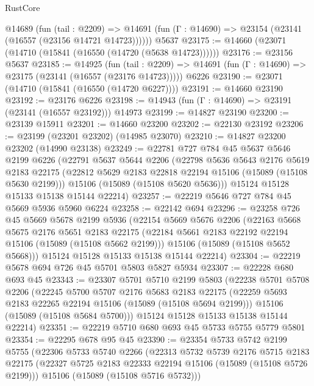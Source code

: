 \begin{lexlean}{RustCore}
\begin{coremodule}
    @14689
      (fun (tail : @2209) =>
      @14691 (fun (Γ : @14690) => @23154 (@23141 (@16557 (@23156 @14721 @14723))))))
    @5637
@23175 := @14660 (@23071 (@14710 (@15841 (@16550 (@14720 (@5638 @14723))))))
@23176 := @23156 @5637
@23185 := @14925
    (fun (tail : @2209) => @14691 (fun (Γ : @14690) => @23175 (@23141 (@16557 (@23176 @14723)))))
    @6226
@23190 := @23071 (@14710 (@15841 (@16550 (@14720 @6227))))
@23191 := @14660 @23190
@23192 := @23176 @6226
@23198 := @14943 (fun (Γ : @14690) => @23191 (@23141 (@16557 @23192))) @14973
@23199 := @14827 @23190
@23200 := @23139 @15911
@23201 := @14660 @23200
@23202 := @22130 @23192
@23206 := @23199 (@23201 @23202) (@14985 @23070)
@23210 := @14827 @23200 @23202 (@14990 @23138)
@23249 := @22781
    @727
    @784
    @45
    @5637
    @5646
    @2199
    @6226
    (@22791
      @5637
      @5644
      @2206
      (@22798
        @5636
        @5643
        @2176
        @5619
        @2183
        @22175
        (@22812 @5629 @2183 @22818 @22194 @15106 (@15089 (@15108 @5630 @2199)))
        @15106
        (@15089 (@15108 @5620 @5636)))
      @15124
      @15128
      @15133
      @15138
      @15144
      @22214)
@23257 := @22219 @5646 @727 @784 @45 @5669 @5936 @5960 @6224
@23258 := @22142 @694
@23296 := @23258
    @726
    @45
    @5669
    @5678
    @2199
    @5936
    (@22154
      @5669
      @5676
      @2206
      (@22163
        @5668
        @5675
        @2176
        @5651
        @2183
        @22175
        (@22184 @5661 @2183 @22192 @22194 @15106 (@15089 (@15108 @5662 @2199)))
        @15106
        (@15089 (@15108 @5652 @5668)))
      @15124
      @15128
      @15133
      @15138
      @15144
      @22214)
@23304 := @22219 @5678 @694 @726 @45 @5701 @5803 @5827 @5934
@23307 := @22228 @680 @693 @45
@23343 := @23307
    @5701
    @5710
    @2199
    @5803
    (@22238
      @5701
      @5708
      @2206
      (@22245
        @5700
        @5707
        @2176
        @5683
        @2183
        @22175
        (@22259 @5693 @2183 @22265 @22194 @15106 (@15089 (@15108 @5694 @2199)))
        @15106
        (@15089 (@15108 @5684 @5700)))
      @15124
      @15128
      @15133
      @15138
      @15144
      @22214)
@23351 := @22219 @5710 @680 @693 @45 @5733 @5755 @5779 @5801
@23354 := @22295 @678 @95 @45
@23390 := @23354
    @5733
    @5742
    @2199
    @5755
    (@22306
      @5733
      @5740
      @2266
      (@22313
        @5732
        @5739
        @2176
        @5715
        @2183
        @22175
        (@22327 @5725 @2183 @22333 @22194 @15106 (@15089 (@15108 @5726 @2199)))
        @15106
        (@15089 (@15108 @5716 @5732)))

\end{coremodule}
\end{lexlean}
